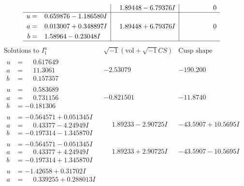 \documentclass[1p]{elsarticle_modified}
\theoremstyle{definition}
\newcommand{\I}{\sqrt{-1}}
\begin{document}
$$\begin{array}{c|c|c}
 & \phantom{-}1.89448 - 6.79376 I & \phantom{-0.000000 } 0 \\ \hline\begin{aligned}
u &= \phantom{-}0.659876 - 1.186580 I \\
a &= \phantom{-}0.013007 + 0.348897 I \\
b &= \phantom{-}1.58964 - 0.23048 I\end{aligned}
 & \phantom{-}1.89448 + 6.79376 I & \phantom{-0.000000 } 0\\
 \hline 
 \end{array}$$\newpage$$\begin{array}{c|c|c}  
\text{Solutions to }I^u_{1}& \I (\text{vol} + \sqrt{-1}CS) & \text{Cusp shape}\\
 \hline 
\begin{aligned}
u &= \phantom{-}0.617649\phantom{ +0.000000I} \\
a &= \phantom{-}11.3061\phantom{ +0.000000I} \\
b &= \phantom{-}0.157357\phantom{ +0.000000I}\end{aligned}
 & -2.53079\phantom{ +0.000000I} & -190.200\phantom{ +0.000000I} \\ \hline\begin{aligned}
u &= \phantom{-}0.583689\phantom{ +0.000000I} \\
a &= \phantom{-}0.731156\phantom{ +0.000000I} \\
b &= -0.181306\phantom{ +0.000000I}\end{aligned}
 & -0.821501\phantom{ +0.000000I} & -11.8740\phantom{ +0.000000I} \\ \hline\begin{aligned}
u &= -0.564571 + 0.051345 I \\
a &= \phantom{-}0.43377 - 4.24949 I \\
b &= -0.197314 - 1.345870 I\end{aligned}
 & \phantom{-}1.89233 - 2.90725 I & -43.5907 + 10.5695 I \\ \hline\begin{aligned}
u &= -0.564571 - 0.051345 I \\
a &= \phantom{-}0.43377 + 4.24949 I \\
b &= -0.197314 + 1.345870 I\end{aligned}
 & \phantom{-}1.89233 + 2.90725 I & -43.5907 - 10.5695 I \\ \hline\begin{aligned}
u &= -1.42658 + 0.31702 I \\
a &= \phantom{-}0.339255 + 0.288013 I \\

\end{aligned}
\end{array}$$
\end{document}
